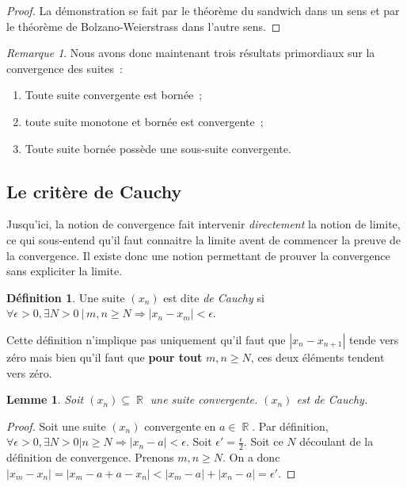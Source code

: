 \documentclass{article}
\DeclareMathOperator{\R}{\mathbb R}
\newtheorem{lem}[thm]{Lemme}
\theoremstyle{definition}
\newtheorem{déf}[thm]{Définition}
\theoremstyle{remark}
\newtheorem*{rmq}{Remarque}
\begin{document}
		\begin{proof} La démonstration se fait par le théorème du sandwich dans un sens et par le théorème de Bolzano-Weierstrass dans l'autre sens. \end{proof}

		\begin{rmq} Nous avons donc maintenant trois résultats primordiaux sur la convergence des suites~:

		\begin{enumerate}
			\item Toute suite convergente est bornée~;
			\item toute suite monotone et bornée est convergente~;
			\item Toute suite bornée possède une sous-suite convergente.
		\end{enumerate}
		\end{rmq}

	\subsection{Le critère de Cauchy}

		Jusqu'ici, la notion de convergence fait intervenir \textit{directement} la notion de limite, ce qui sous-entend qu'il faut connaitre la limite avent de
		commencer la preuve de la convergence. Il existe donc une notion permettant de prouver la convergence sans expliciter la limite.

		\begin{déf} Une suite $(x_n)$ est dite \textit{de Cauchy} si $\forall \epsilon > 0, \exists N > 0 \ | \, m, n \geq N \Rightarrow |x_n - x_m| < \epsilon$.
		\end{déf}

		Cette définition n'implique pas uniquement qu'il faut que $|x_n - x_{n+1}|$ tende vers zéro mais bien qu'il faut que \textbf{pour tout} $m, n \geq N$,
		ces deux éléments tendent vers zéro.

		\begin{lem} Soit $(x_n) \subseteq \R$ une suite convergente. $(x_n)$ est de Cauchy. \end{lem}

		\begin{proof} Soit une suite $(x_n)$ convergente en $a \in \R$. Par définition,
		$\forall \epsilon > 0, \exists N > 0 | n \geq N \Rightarrow | x_n - a| < \epsilon$. Soit $\epsilon' = \frac \epsilon2$. Soit ce $N$ découlant de la
		définition de convergence. Prenons $m, n \geq N$. On a donc $|x_m - x_n| = |x_m - a + a - x_n| < |x_m - a | + |x_n - a| = \epsilon'$. \end{proof}
\end{document}
